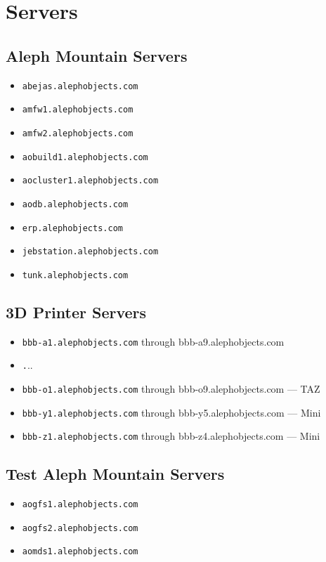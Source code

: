 %
%
%
%
%

\section{Servers}

\subsection{Aleph Mountain Servers}
\begin{itemize}
\item \texttt{abejas.alephobjects.com}
\item \texttt{amfw1.alephobjects.com}
\item \texttt{amfw2.alephobjects.com}
\item \texttt{aobuild1.alephobjects.com}
\item \texttt{aocluster1.alephobjects.com}
\item \texttt{aodb.alephobjects.com}
\item \texttt{erp.alephobjects.com}
\item \texttt{jebstation.alephobjects.com}
\item \texttt{tunk.alephobjects.com}
\end{itemize}

\subsection{3D Printer Servers}
\begin{itemize}
\item \texttt{bbb-a1.alephobjects.com} through {bbb-a9.alephobjects.com}
\item \texttt ...
\item \texttt{bbb-o1.alephobjects.com} through {bbb-o9.alephobjects.com} --- TAZ
\item \texttt{bbb-y1.alephobjects.com} through {bbb-y5.alephobjects.com} --- Mini
\item \texttt{bbb-z1.alephobjects.com} through {bbb-z4.alephobjects.com} --- Mini
\end{itemize}

\subsection{Test Aleph Mountain Servers}
\begin{itemize}
\item \texttt{aogfs1.alephobjects.com}
\item \texttt{aogfs2.alephobjects.com}
\item \texttt{aomds1.alephobjects.com}
\end{itemize}

